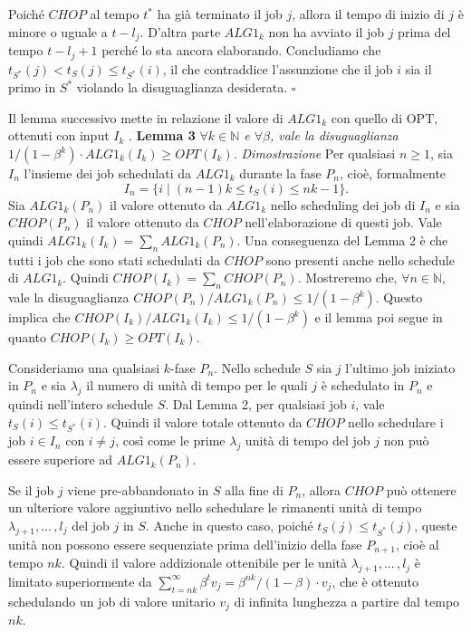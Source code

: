 \documentclass[12pt]{article}
\newcommand*{\N}{\mathbb{N}}
\begin{document}
Poiché $CHOP$  al tempo $t^{*}$ ha già terminato il job $j$,  allora il tempo di inizio di $j$ è minore o uguale a $t - l_{j}$. D'altra parte $ALG1_{k}$ non ha avviato il job $j$ prima del tempo $t - l_{j} + 1$ perché lo sta ancora elaborando. Concludiamo che $t_{S^{*}}(j) < t_{S}(j) \leq t_{S^{*}}(i)$, il che contraddice l'assunzione che il job $i$ sia il primo in $S^{*}$ violando la disuguaglianza desiderata. \hfill $\square$ \vspace{5mm} 

Il lemma successivo mette in relazione il valore di $ALG1_{k}$ con quello di OPT, ottenuti con input $I_{k}$ . \newline\newline
\textbf{Lemma 3} 
\textit{$\forall k \in \N$ e $\forall \beta$, vale la disuguaglianza $1/(1-\beta^{k} ) \cdot ALG1_{k}(I_{k}) \geq OPT(I_{k})$.}\newline\newline
\textit{Dimostrazione}
Per qualsiasi $n \geq 1$, sia $I_{n}$ l'insieme dei job schedulati da $ALG1_{k}$ durante la fase $P_{n}$, cioè, formalmente $$I_{n} = \{i\;| \; (n - 1)k \leq t_{S}(i) \leq nk - 1\}.$$ Sia $ALG1_{k}(P_{n})$ il valore ottenuto da $ALG1_{k}$ nello scheduling dei job di $I_{n}$ e sia $CHOP(P_{n})$ il valore ottenuto da $CHOP$ nell'elaborazione di questi job. Vale quindi $ALG1_{k}(I_{k}) = \sum_{n} ALG1_{k}(P_{n})$. Una conseguenza del Lemma 2 è che tutti i job che sono stati schedulati da $CHOP$ sono presenti anche nello schedule di $ALG1_{k}$. Quindi $CHOP(I_{k}) = \sum_{n} CHOP(P_{n})$. Mostreremo che, $\forall n \in \N$, vale la disuguaglianza $CHOP(P_{n})/ALG1_{k} (P_{n}) \leq 1/(1 - \beta^{k})$. Questo implica che $CHOP(I_{k})/ALG1_{k} (I_{k} ) \leq 1/(1 - \beta^{k})$ e il lemma poi segue in quanto $CHOP(I_{k}) \geq OPT(I_{k})$. 

Consideriamo una qualsiasi $k$-fase $P_{n}$. Nello schedule $S$ sia $j$ l'ultimo job iniziato in $P_{n}$ e sia $\lambda_{j}$ il numero di unità di tempo per le quali $j$ è schedulato in $P_{n}$ e quindi nell'intero schedule $S$. Dal Lemma 2, per qualsiasi job $i$, vale $t_{S}(i) \leq t_{S^{*}}(i)$. Quindi il valore totale ottenuto da $CHOP$ nello schedulare i job $i \in I_{n}$ con $i \neq j$, così come le prime $\lambda_{j}$ unità di tempo del job $j$ non può essere superiore ad $ALG1_{k}(P_{n})$. 

Se il job $j$ viene pre-abbandonato in $S$ alla fine di $P_{n}$, allora $CHOP$ può ottenere un ulteriore valore aggiuntivo nello schedulare le rimanenti unità di tempo $\lambda_{j + 1},...\,, l_{j}$ del job $j$ in $S$. Anche in questo caso, poiché $t_{S}(j) \leq t_{S^{*}}(j)$, queste unità non possono essere sequenziate prima dell'inizio della fase $P_{n+1}$, cioè al tempo $nk$. Quindi il valore addizionale ottenibile per le unità $\lambda_{j + 1},...\,,l_{j}$ è limitato superiormente da $\sum_{t=nk}^{\infty} \beta^{t} v_{j} = \beta^{nk}/(1 - \beta ) \cdot v_{j}$, che è ottenuto schedulando un job di valore unitario $v_{j}$ di infinita lunghezza a partire dal tempo $nk$. 
\end{document}
